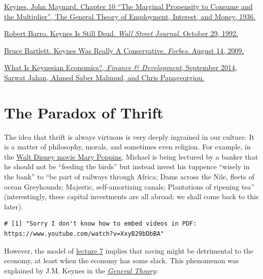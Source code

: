 \documentclass[]{book}
\theoremstyle{definition}
\theoremstyle{definition}
\theoremstyle{definition}
\theoremstyle{remark}
\begin{document}
\href{https://cas2.umkc.edu/economics/people/facultypages/kregel/courses/econ645/winter2011/generaltheory.pdf}{Keynes,
John Maynard. Chapter 10 ``The Marginal Propensity to Consume and the
Multiplier'', The General Theory of Employment, Interest, and Money,
1936.}

\href{https://search.proquest.com/docview/398378701/fulltext/CBD1D9A468D04A85PQ/4?accountid=14512}{Robert
Barro. Keynes Is Still Dead. \emph{Wall Street Journal}. October 29,
1992.}

\href{https://www.forbes.com/2009/08/13/john-maynard-keynes-conservative-opinions-columnists-bruce-bartlett.html}{Bruce
Bartlett. Keynes Was Really A Conservative. \emph{Forbes}. August 14,
2009.}

\href{http://www.imf.org/external/pubs/ft/fandd/2014/09/pdf/basics.pdf}{What
Is Keynesian Economics?, \emph{Finance \& Development}, September 2014,
Sarwat Jahan, Ahmed Saber Mahmud, and Chris Papageorgiou.}

\hypertarget{paradox-thrift}{\chapter{The Paradox of
Thrift}\label{paradox-thrift}}

The idea that thrift is always virtuous is very deeply ingrained in our
culture. It is a matter of philosophy, morals, and sometimes even
religion. For example, in the
\href{https://www.youtube.com/watch?v=XxyB29bDbBA}{Walt Disney movie
Mary Poppins}, Michael is being lectured by a banker that he should not
be ``feeding the birds'' but instead invest his tuppence ``wisely in the
bank'' to ``be part of railways through Africa; Dams across the Nile,
fleets of ocean Greyhounds; Majestic, self-amortizing canals;
Plantations of ripening tea'' (interestingly, these capital investments
are all abroad; we shall come back to this later).

\begin{verbatim}
# [1] "Sorry I don't know how to embed videos in PDF: https://www.youtube.com/watch?v=XxyB29bDbBA"
\end{verbatim}

However, the model of \protect\hyperlink{cons-function}{lecture 7}
implies that saving might be detrimental to the economy, at least when
the economy has some slack. This phenomenon was explained by J.M. Keynes
in the
\href{http://cas2.umkc.edu/economics/people/facultypages/kregel/courses/econ645/winter2011/generaltheory.pdf}{\emph{General
Theory}}:
\end{document}
